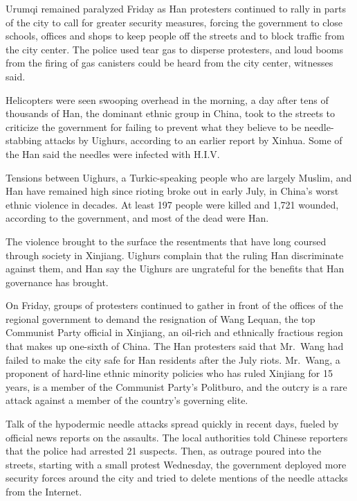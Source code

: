 ﻿\documentclass[12pt]{article}
\begin{document}
Urumqi remained paralyzed Friday as Han protesters continued to rally in parts of the city to call
for greater security measures, forcing the government to close schools, offices and shops to keep
people off the streets and to block traffic from the city center. The police used tear gas to
disperse protesters, and loud booms from the firing of gas canisters could be heard from the city
center, witnesses said.

Helicopters were seen swooping overhead in the morning, a day after tens of thousands of Han, the
dominant ethnic group in China, took to the streets to criticize the government for failing to
prevent what they believe to be needle-stabbing attacks by Uighurs, according to an earlier report
by Xinhua. Some of the Han said the needles were infected with H.I.V.

Tensions between Uighurs, a Turkic-speaking people who are largely Muslim, and Han have remained
high since rioting broke out in early July, in China's worst ethnic violence in decades. At least
197 people were killed and 1,721 wounded, according to the government, and most of the dead were
Han.

The violence brought to the surface the resentments that have long coursed through society in
Xinjiang. Uighurs complain that the ruling Han discriminate against them, and Han say the Uighurs
are ungrateful for the benefits that Han governance has brought.

On Friday, groups of protesters continued to gather in front of the offices of the regional
government to demand the resignation of Wang Lequan, the top Communist Party official in Xinjiang,
an oil-rich and ethnically fractious region that makes up one-sixth of China. The Han protesters
said that Mr.~Wang had failed to make the city safe for Han residents after the July riots.
Mr.~Wang, a proponent of hard-line ethnic minority policies who has ruled Xinjiang for 15 years, is
a member of the Communist Party's Politburo, and the outcry is a rare attack against a member of the
country's governing elite.

Talk of the hypodermic needle attacks spread quickly in recent days, fueled by official news reports
on the assaults. The local authorities told Chinese reporters that the police had arrested 21
suspects. Then, as outrage poured into the streets, starting with a small protest Wednesday, the
government deployed more security forces around the city and tried to delete mentions of the needle
attacks from the Internet.
\end{document}
